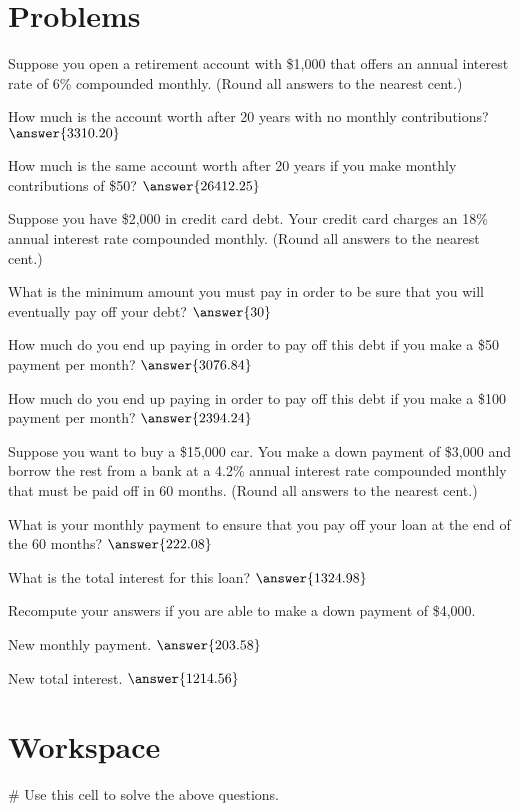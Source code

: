 \documentclass{ximera}
\begin{document}
\section{Problems}

\begin{question}
Suppose you open a retirement account with \$1,000 that offers an annual interest rate of 6\% compounded monthly. (Round all answers to the nearest cent.)

How much is the account worth after 20 years with no monthly contributions? $\answer{3310.20}$

How much is the same account worth after 20 years if you make monthly contributions of \$50? $\answer{26412.25}$
\end{question}

\begin{question}
Suppose you have \$2,000 in credit card debt. Your credit card charges an 18\% annual interest rate compounded monthly. (Round all answers to the nearest cent.)

What is the minimum amount you must pay in order to be sure that you will eventually pay off your debt? $\answer{30}$

How much do you end up paying in order to pay off this debt if you make a \$50 payment per month? $\answer{3076.84}$

How much do you end up paying in order to pay off this debt if you make a \$100 payment per month? $\answer{2394.24}$
\end{question}

\begin{question}
Suppose you want to buy a \$15,000 car. You make a down payment of \$3,000 and borrow the rest from a bank at a 4.2\% annual interest rate compounded monthly that must be paid off in 60 months. (Round all answers to the nearest cent.)
	
What is your monthly payment to ensure that you pay off your loan at the end of the 60 months? $\answer{222.08}$

What is the total interest for this loan? $\answer{1324.98}$

Recompute your answers if you are able to make a down payment of \$4,000.

New monthly payment. $\answer{203.58}$

New total interest. $\answer{1214.56}$
\end{question}

\section{Workspace}

\begin{sageCell}
# Use this cell to solve the above questions.
\end{sageCell}
\end{document}
